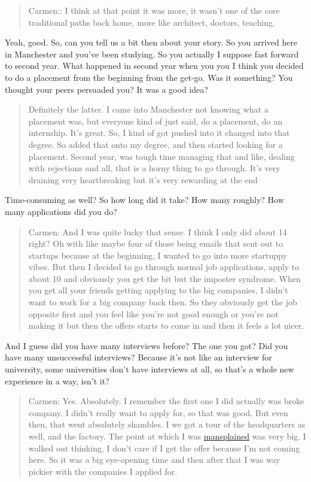 \documentclass[
]{book}
\begin{document}
\begin{quote}
Carmen:: I think at that point it was more, it wasn't one of the core traditional paths back home, more like architect, doctors, teaching.
\end{quote}

Yeah, good. So, can you tell us a bit then about your story. So you arrived here in Manchester and you've been studying. So you actually I suppose fast forward to second year. What happened in second year when you you I think you decided to do a placement from the beginning from the get-go. Was it something? You thought your peers persuaded you? It was a good idea?

\begin{quote}
Definitely the latter. I came into Manchester not knowing what a placement was, but everyone kind of just said, do a placement, do an internship. It's great. So, I kind of got pushed into it changed into that degree. So added that onto my degree, and then started looking for a placement. Second year, was tough time managing that and like, dealing with rejections and all, that is a horny thing to go through. It's very draining very heartbreaking but it's very rewarding at the end
\end{quote}

Time-consuming as well? So how long did it take? How many roughly? How many applications did you do?

\begin{quote}
Carmen: And I was quite lucky that sense. I think I only did about 14 right? Oh with like maybe four of those being emails that sent out to startups because at the beginning, I wanted to go into more startuppy vibes. But then I decided to go through normal job applications, apply to about 10 and obviously you get the bit but the imposter syndrome. When you get all your friends getting applying to the big companies, I didn't want to work for a big company back then. So they obviously get the job opposite first and you feel like you're not good enough or you're not making it but then the offers starts to come in and then it feels a lot nicer.
\end{quote}

And I guess did you have many interviews before? The one you got? Did you have many unsuccessful interviews? Because it's not like an interview for university, some universities don't have interviews at all, so that's a whole new experience in a way, isn't it?

\begin{quote}
Carmen: Yes. Absolutely. I remember the first one I did actually was broke company. I didn't really want to apply for, so that was good. But even then, that went absolutely shambles. I we got a tour of the headquarters as well, and the factory. The point at which I was \href{https://en.wikipedia.org/wiki/Mansplaining}{mansplained} was very big. I walked out thinking, I don't care if I get the offer because I'm not coming here. So it was a big eye-opening time and then after that I was way pickier with the companies I applied for.
\end{quote}
\end{document}
